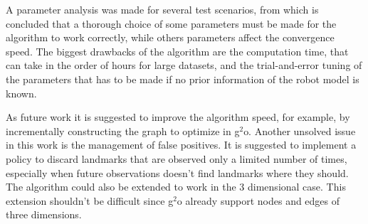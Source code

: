 A parameter analysis was made for several test scenarios, from which is concluded that a thorough choice of some parameters must be made for the algorithm to work correctly, while others parameters affect the convergence speed. The biggest drawbacks of the algorithm are the computation time, that can take in the order of hours for large datasets, and the trial-and-error tuning of the parameters that has to be made if no prior information of the robot model is known. 

As future work it is suggested to improve the algorithm speed, for example, by incrementally constructing the graph to optimize in g$^2$o. Another unsolved issue in this work is the management of false positives. It is suggested to implement a policy to discard landmarks that are observed only a limited number of times, especially when future observations doesn't find landmarks where they should. The algorithm could also be extended to work in the 3 dimensional case. This extension shouldn't be difficult since g$^2$o already support nodes and edges of three dimensions. 
